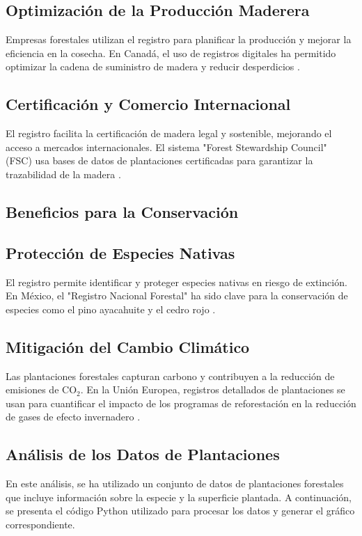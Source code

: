 \subsection{Optimización de la Producción Maderera}
Empresas forestales utilizan el registro para planificar la producción y mejorar la eficiencia en la cosecha. En Canadá, el uso de registros digitales ha permitido optimizar la cadena de suministro de madera y reducir desperdicios \cite{canadaforest2023}.

\subsection{Certificación y Comercio Internacional}
El registro facilita la certificación de madera legal y sostenible, mejorando el acceso a mercados internacionales. El sistema "Forest Stewardship Council" (FSC) usa bases de datos de plantaciones certificadas para garantizar la trazabilidad de la madera \cite{fsc2021}.
\subsection{Beneficios para la Conservación}
\subsection{Protección de Especies Nativas}
El registro permite identificar y proteger especies nativas en riesgo de extinción. En México, el "Registro Nacional Forestal" ha sido clave para la conservación de especies como el pino ayacahuite y el cedro rojo \cite{mexicoforest2020}.

\subsection{Mitigación del Cambio Climático}
Las plantaciones forestales capturan carbono y contribuyen a la reducción de emisiones de CO$_2$. En la Unión Europea, registros detallados de plantaciones se usan para cuantificar el impacto de los programas de reforestación en la reducción de gases de efecto invernadero \cite{ueforest2022}.

\subsection{Análisis de los Datos de Plantaciones}
En este análisis, se ha utilizado un conjunto de datos de plantaciones forestales que incluye información sobre la especie y la superficie plantada. A continuación, se presenta el código Python utilizado para procesar los datos y generar el gráfico correspondiente.

